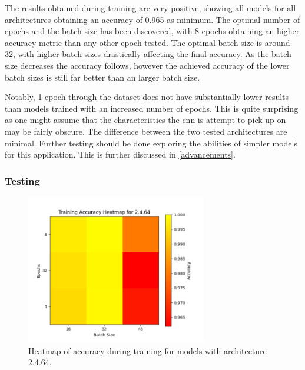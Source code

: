 \documentclass[12pt]{article}
\begin{document}
The results obtained during training are very positive, showing all models for all architectures obtaining an accuracy of 0.965 as minimum. The optimal number of epochs and the batch size has been discovered, with 8 epochs obtaining an higher accuracy metric than any other epoch tested. The optimal batch size is around 32, with higher batch sizes drastically affecting the final accuracy. As the batch size decreases the accuracy follows, however the achieved accuracy of the lower batch sizes is still far better than an larger batch size. 

Notably, 1 epoch through the dataset does not have substantially lower results than models trained with an increased number of epochs. This is quite surprising as one might assume that the characteristics the \acrshort{cnn} is attempt to pick up on may be fairly obscure. The difference between the two tested architectures are minimal. Further testing should be done exploring the abilities of simpler models for this application. This is further discussed in \ref{advancements}.




\subsubsection{Testing}

\begin{figure}[H]
\includegraphics[width=0.7\textwidth]{heatmap_training_accuracy_2.4.64}
\centering
\caption{Heatmap of accuracy during training for models with architecture 2.4.64.}
\label{fig:time-metrics}
\end{figure}
\end{document}
